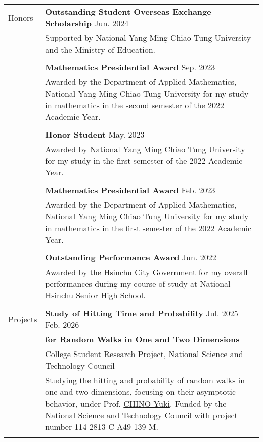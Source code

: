 \documentclass[letterpaper, 11pt]{article}
\begin{document}
\begin{center}
\begin{longtable}{p{0.76in}p{5.93in}}
        {\textcolor{OliveGreen}{Honors}} & \textbf{Outstanding Student Overseas Exchange Scholarship} \hfill Jun. 2024\\
        & Supported by National Yang Ming Chiao Tung University and the Ministry of Education. \\
        & \\
        & \textbf{Mathematics Presidential Award} \hfill Sep. 2023\\
        & Awarded by the Department of Applied Mathematics, National Yang Ming Chiao Tung University for my study in mathematics in the second semester of the 2022 Academic Year.\\
        & \\
        & \textbf{Honor Student} \hfill May. 2023\\
        & Awarded by National Yang Ming Chiao Tung University for my study in the first semester of the 2022 Academic Year. \\
        & \\
        & \textbf{Mathematics Presidential Award} \hfill Feb. 2023\\
        & Awarded by the Department of Applied Mathematics, National Yang Ming Chiao Tung University for my study in mathematics in the first semester of the 2022 Academic Year.\\
        & \\
        & \textbf{Outstanding Performance Award} \hfill Jun. 2022\\
        & Awarded by the Hsinchu City Government for my overall performances during my course of study at National Hsinchu Senior High School.\\
        & \\
        

        {\textcolor{OliveGreen}{Projects}} & \textbf{Study of Hitting Time and Probability} \hfill Jul. 2025 -- Feb. 2026\\
        & \textbf{\quad \quad \quad for Random Walks in One and Two Dimensions} \\
        & College Student Research Project, National Science and Technology Council\\
        & Studying the hitting and probability of random walks in one and two dimensions, focusing on their asymptotic behavior, under Prof. \href{https://scholar.nycu.edu.tw/en/persons/yuki-chino}{CHINO Yuki}. Funded by the National Science and Technology Council with project number 114-2813-C-A49-139-M.\\
        & \\
        


\end{longtable}
\end{center}
\end{document}

